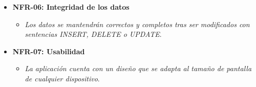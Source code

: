 \documentclass[../../main.tex]{subfiles}
\begin{document}
\begin{itemize}
    \item \textbf{NFR-06: Integridad de los datos}
    \begin{itemize}
        \item \textit{Los datos se mantendrán correctos y completos tras ser modificados con sentencias INSERT, DELETE o UPDATE}.
    \end{itemize}
    \item \textbf{NFR-07: Usabilidad}
    \begin{itemize}
        \item \textit{La aplicación cuenta con un diseño que se adapta al tamaño de pantalla de cualquier dispositivo}.
    \end{itemize}
\end{itemize}
\end{document}

